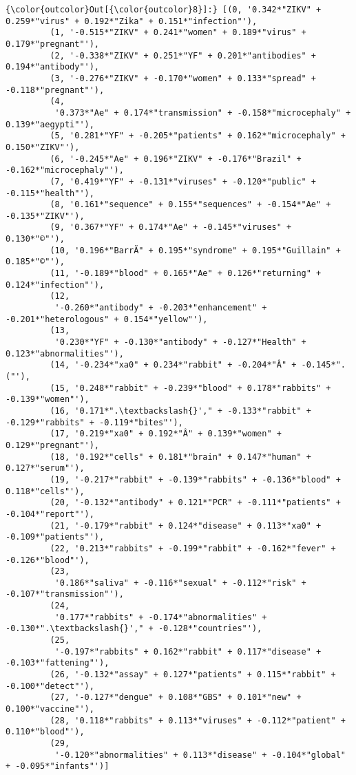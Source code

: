 \documentclass[11pt]{article}
\begin{document}
            \begin{Verbatim}[commandchars=\\\{\}]
{\color{outcolor}Out[{\color{outcolor}8}]:} [(0, '0.342*"ZIKV" + 0.259*"virus" + 0.192*"Zika" + 0.151*"infection"'),
         (1, '-0.515*"ZIKV" + 0.241*"women" + 0.189*"virus" + 0.179*"pregnant"'),
         (2, '-0.338*"ZIKV" + 0.251*"YF" + 0.201*"antibodies" + 0.194*"antibody"'),
         (3, '-0.276*"ZIKV" + -0.170*"women" + 0.133*"spread" + -0.118*"pregnant"'),
         (4,
          '0.373*"Ae" + 0.174*"transmission" + -0.158*"microcephaly" + 0.139*"aegypti"'),
         (5, '0.281*"YF" + -0.205*"patients" + 0.162*"microcephaly" + 0.150*"ZIKV"'),
         (6, '-0.245*"Ae" + 0.196*"ZIKV" + -0.176*"Brazil" + -0.162*"microcephaly"'),
         (7, '0.419*"YF" + -0.131*"viruses" + -0.120*"public" + -0.115*"health"'),
         (8, '0.161*"sequence" + 0.155*"sequences" + -0.154*"Ae" + -0.135*"ZIKV"'),
         (9, '0.367*"YF" + 0.174*"Ae" + -0.145*"viruses" + 0.130*"©"'),
         (10, '0.196*"BarrÃ" + 0.195*"syndrome" + 0.195*"Guillain" + 0.185*"©"'),
         (11, '-0.189*"blood" + 0.165*"Ae" + 0.126*"returning" + 0.124*"infection"'),
         (12,
          '-0.260*"antibody" + -0.203*"enhancement" + -0.201*"heterologous" + 0.154*"yellow"'),
         (13,
          '0.230*"YF" + -0.130*"antibody" + -0.127*"Health" + 0.123*"abnormalities"'),
         (14, '-0.234*"xa0" + 0.234*"rabbit" + -0.204*"Â" + -0.145*".("'),
         (15, '0.248*"rabbit" + -0.239*"blood" + 0.178*"rabbits" + -0.139*"women"'),
         (16, '0.171*".\textbackslash{}'," + -0.133*"rabbit" + -0.129*"rabbits" + -0.119*"bites"'),
         (17, '0.219*"xa0" + 0.192*"Â" + 0.139*"women" + 0.129*"pregnant"'),
         (18, '0.192*"cells" + 0.181*"brain" + 0.147*"human" + 0.127*"serum"'),
         (19, '-0.217*"rabbit" + -0.139*"rabbits" + -0.136*"blood" + 0.118*"cells"'),
         (20, '-0.132*"antibody" + 0.121*"PCR" + -0.111*"patients" + -0.104*"report"'),
         (21, '-0.179*"rabbit" + 0.124*"disease" + 0.113*"xa0" + -0.109*"patients"'),
         (22, '0.213*"rabbits" + -0.199*"rabbit" + -0.162*"fever" + -0.126*"blood"'),
         (23,
          '0.186*"saliva" + -0.116*"sexual" + -0.112*"risk" + -0.107*"transmission"'),
         (24,
          '0.177*"rabbits" + -0.174*"abnormalities" + -0.130*".\textbackslash{}'," + -0.128*"countries"'),
         (25,
          '-0.197*"rabbits" + 0.162*"rabbit" + 0.117*"disease" + -0.103*"fattening"'),
         (26, '-0.132*"assay" + 0.127*"patients" + 0.115*"rabbit" + -0.100*"detect"'),
         (27, '-0.127*"dengue" + 0.108*"GBS" + 0.101*"new" + 0.100*"vaccine"'),
         (28, '0.118*"rabbits" + 0.113*"viruses" + -0.112*"patient" + 0.110*"blood"'),
         (29,
          '-0.120*"abnormalities" + 0.113*"disease" + -0.104*"global" + -0.095*"infants"')]
\end{Verbatim}
        
\end{document}
